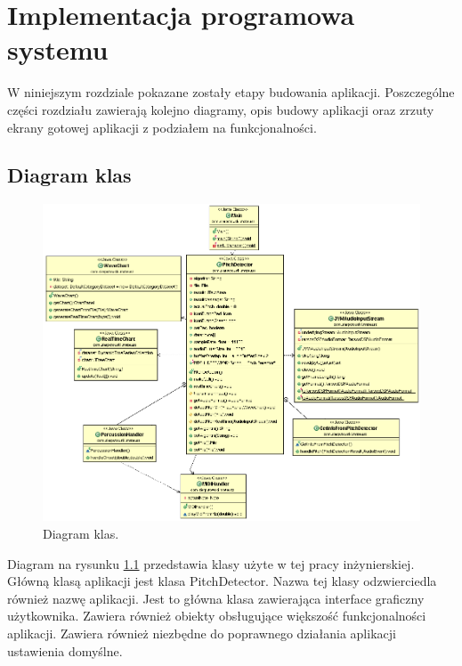\chapter{{Implementacja programowa systemu}}
\label{chapter:implementacja}

W niniejszym rozdziale pokazane zostały etapy budowania aplikacji. Poszczególne części rozdziału zawierają kolejno diagramy, opis budowy aplikacji oraz zrzuty ekrany gotowej aplikacji z podziałem na funkcjonalności.

\section{{Diagram klas}}

\begin{figure}[h!]
  \centering
  \includegraphics[width=0.9\linewidth]{rys/diagram1}
  \caption{Diagram klas.}
  \label{diagram_klas}
\end{figure}

Diagram na rysunku \ref{diagram_klas} przedstawia klasy użyte w tej pracy inżynierskiej. Główną klasą aplikacji jest klasa PitchDetector. Nazwa tej klasy odzwierciedla również nazwę aplikacji. Jest to główna klasa zawierająca interface graficzny użytkownika. Zawiera również obiekty obsługujące większość funkcjonalności aplikacji. Zawiera również niezbędne do poprawnego działania aplikacji ustawienia domyślne. 



